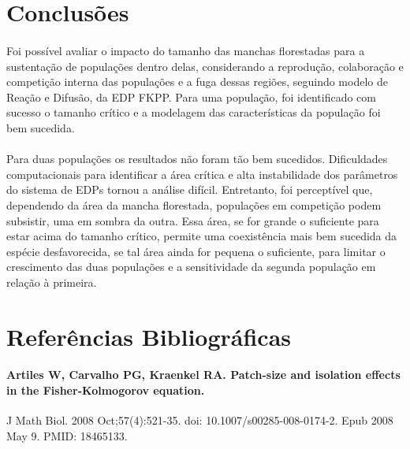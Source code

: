 \documentclass{article}
\begin{document}
	\section{Conclusões}
	
	\paragraph{}
	Foi possível avaliar o impacto do tamanho das manchas florestadas para a sustentação de populações dentro delas, considerando a reprodução, colaboração e competição interna das populações e a fuga dessas regiões, seguindo modelo de Reação e Difusão, da EDP FKPP. Para uma população, foi identificado com sucesso o tamanho crítico e a modelagem das características da população foi bem sucedida. 
	
	\paragraph{}
	Para duas populações os resultados não foram tão bem sucedidos. Dificuldades computacionais para identificar a área crítica e alta instabilidade dos parâmetros do sistema de EDPs tornou a análise difícil. Entretanto, foi perceptível que, dependendo da área da mancha florestada, populações em competição podem subsistir, uma em sombra da outra. Essa área, se for grande o suficiente para estar acima do tamanho crítico, permite uma coexistência mais bem sucedida da espécie desfavorecida, se tal área ainda for pequena o suficiente, para limitar o crescimento das duas populações e a sensitividade da segunda população em relação à primeira.
	
	\section{Referências Bibliográficas}
	
	\paragraph{Artiles W, Carvalho PG, Kraenkel RA. Patch-size and isolation effects in the Fisher-Kolmogorov equation.}
	J Math Biol. 2008 Oct;57(4):521-35. doi: 10.1007/s00285-008-0174-2. Epub 2008 May 9. PMID: 18465133.
\end{document}
